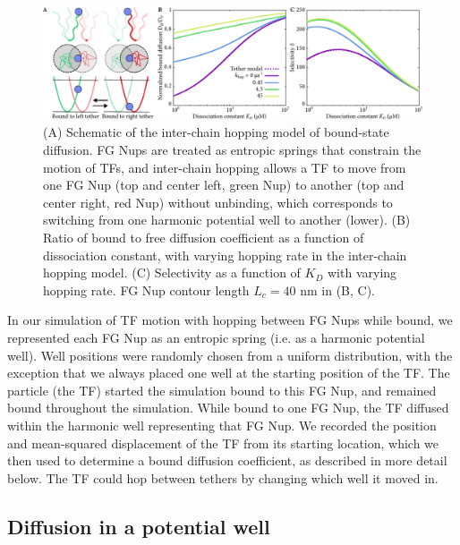 \begin{figure}
\centering
\includegraphics[width = \textwidth]{figs/ch02/fig4.pdf}
\caption{(A) Schematic of the inter-chain hopping model of bound-state diffusion. FG Nups are treated as entropic springs that constrain the motion of TFs, and inter-chain hopping allows a TF to move from one FG Nup (top and center left, green Nup) to another (top and center right, red Nup) without unbinding, which corresponds to switching from one harmonic potential well to another (lower). (B) Ratio of bound to free diffusion coefficient as a function of dissociation constant, with varying hopping rate in the inter-chain hopping model.  (C) Selectivity as a function of $K_D$ with varying hopping rate. FG Nup contour length $L_c = 40$ nm in (B, C). }
\label{fig:hopping}
\end{figure}

In our simulation of TF motion with hopping between FG Nups while bound, we represented each FG Nup as an entropic spring (i.e. as a harmonic potential well).  Well positions were randomly chosen from a uniform distribution, with the exception that we always placed one well at the starting position of the TF.  The particle (the TF) started the simulation bound to this FG Nup, and remained bound throughout the simulation.  While bound to one FG Nup, the TF diffused within the harmonic well representing that FG Nup. We recorded the position and mean-squared displacement of the TF from its starting location, which we then used to determine a bound diffusion coefficient, as described in more detail below.  The TF could hop between tethers by changing which well it moved in.

\subsection{Diffusion in a potential well}

